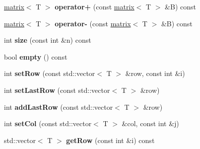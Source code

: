 \begin{DoxyCompactItemize}
\item 
\hypertarget{classkeycpp_1_1matrix_a8c0520cf5064379afa5128cf7f660832}{\hyperlink{classkeycpp_1_1matrix}{matrix}$<$ T $>$ {\bfseries operator+} (const \hyperlink{classkeycpp_1_1matrix}{matrix}$<$ T $>$ \&B) const }\label{classkeycpp_1_1matrix_a8c0520cf5064379afa5128cf7f660832}

\item 
\hypertarget{classkeycpp_1_1matrix_a1c6cb00f8859e6486a7054f11b1c7e6a}{\hyperlink{classkeycpp_1_1matrix}{matrix}$<$ T $>$ {\bfseries operator-\/} (const \hyperlink{classkeycpp_1_1matrix}{matrix}$<$ T $>$ \&B) const }\label{classkeycpp_1_1matrix_a1c6cb00f8859e6486a7054f11b1c7e6a}

\item 
\hypertarget{classkeycpp_1_1matrix_a32a13ebb69fb5f06dd8923d942d865b4}{int {\bfseries size} (const int \&n) const }\label{classkeycpp_1_1matrix_a32a13ebb69fb5f06dd8923d942d865b4}

\item 
\hypertarget{classkeycpp_1_1matrix_ad522f701e86eafc344d8904d4f0a8f19}{bool {\bfseries empty} () const }\label{classkeycpp_1_1matrix_ad522f701e86eafc344d8904d4f0a8f19}

\item 
\hypertarget{classkeycpp_1_1matrix_a4b28c8f7b6e3d32aab1416faa9316e11}{int {\bfseries set\-Row} (const std\-::vector$<$ T $>$ \&row, const int \&i)}\label{classkeycpp_1_1matrix_a4b28c8f7b6e3d32aab1416faa9316e11}

\item 
\hypertarget{classkeycpp_1_1matrix_ac7675f496771e688a1c059b58ac975cb}{int {\bfseries set\-Last\-Row} (const std\-::vector$<$ T $>$ \&row)}\label{classkeycpp_1_1matrix_ac7675f496771e688a1c059b58ac975cb}

\item 
\hypertarget{classkeycpp_1_1matrix_aa6903fc828a5b42f7c1d9485832601aa}{int {\bfseries add\-Last\-Row} (const std\-::vector$<$ T $>$ \&row)}\label{classkeycpp_1_1matrix_aa6903fc828a5b42f7c1d9485832601aa}

\item 
\hypertarget{classkeycpp_1_1matrix_adf4d81176c098ead33c56d84421b14f5}{int {\bfseries set\-Col} (const std\-::vector$<$ T $>$ \&col, const int \&j)}\label{classkeycpp_1_1matrix_adf4d81176c098ead33c56d84421b14f5}

\item 
\hypertarget{classkeycpp_1_1matrix_a14cad5ff7a9b3079754fc83b677208ed}{std\-::vector$<$ T $>$ {\bfseries get\-Row} (const int \&i) const }\label{classkeycpp_1_1matrix_a14cad5ff7a9b3079754fc83b677208ed}


\end{DoxyCompactItemize}
